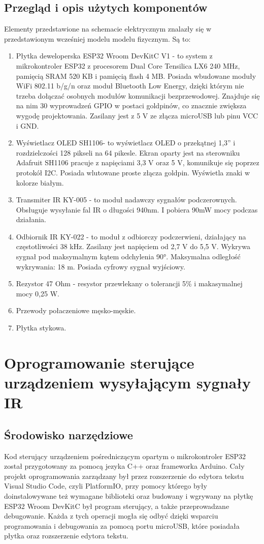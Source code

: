 \documentclass[12pt,twoside,draft]{article}
\begin{document}
\subsection{Przegląd i opis użytych komponentów}
Elementy przedstawione na schemacie elektrycznym znalazły się w przedstawionym wcześniej modelu modelu fizycznym. Są to:
\begin{enumerate}[label=\alph*), leftmargin=1.25cm]
   \item Płytka deweloperska ESP32 Wroom DevKitC V1\cite{doitDevKitV1} - to system z mikrokontroler ESP32 z procesorem Dual Core Tensilica LX6 240 MHz, pamięcią SRAM 520 KB i pamięcią flash 4 MB. Posiada wbudowane moduły WiFi 802.11 b/g/n oraz moduł Bluetooth Low Energy, dzięki którym nie trzeba dołączać osobnych modułów komunikacji bezprzewodowej. Znajduje się na nim 30 wyprowadzeń GPIO w postaci goldpinów, co znacznie zwiększa wygodę projektowania. Zasilany jest z 5 V ze złącza microUSB lub pinu VCC i GND.
   \item Wyświetlacz OLED SH1106\cite{sh1106}- to wyświetlacz OLED o przekątnej 1,3'' i rozdzielczości 128 pikseli na 64 pikesle. Ekran oparty jest na sterowniku Adafruit SH1106 pracuje z napięciami 3,3 V oraz 5 V, komunikuje się poprzez protokół I2C. Posiada wlutowane proste złącza goldpin. Wyświetla znaki w kolorze białym.
   \item Transmiter IR KY-005\cite{ky005} - to moduł nadawczy sygnałów podczerownych. Obsługuje wysyłanie fal IR o długości 940nm. I pobiera 90mW mocy podczas działania.
   \item Odbiornik IR KY-022\cite{ky022}  - to moduł z odbiorczy podczerwieni, działający na częstotliwości 38 kHz. Zasilany jest napięciem od 2,7 V do 5,5 V. Wykrywa sygnał pod maksymalnym kątem odchylenia 90°. Maksymalna odległość wykrywania: 18 m. Posiada cyfrowy sygnał wyjściowy.
   \item Rezystor 47 Ohm - resystor przewlekany o tolerancji 5\% i makasymalnej mocy 0,25 W.
   \item Przewody połaczeniowe męsko-męskie.
   \item Płytka stykowa.
\end{enumerate}

\clearpage

\section{Oprogramowanie sterujące urządzeniem wysyłającym sygnały IR}
\subsection{Środowisko narzędziowe}
Kod sterujący urządzeniem pośredniczącym opartym o mikrokontroler ESP32 został przygotowany za pomocą jezyka C++ oraz frameworka Arduino. Cały projekt oprogramowania zarządzany był przez rozszerzenie do edytora tekstu Visual Studio Code, czyli PlatformIO, przy pomocy którego były doinstalowywane też wymagane biblioteki oraz budowany i wgrywany na płytkę ESP32 Wroom DevKitC był program sterujący, a także przeprowadzane debugowanie. Każda z tych operacji mogła się odbyć dzięki wsparciu programowania i debugowania za pomocą portu microUSB, które posiadała płytka oraz rozszerzenie edytora tekstu.
\end{document}
